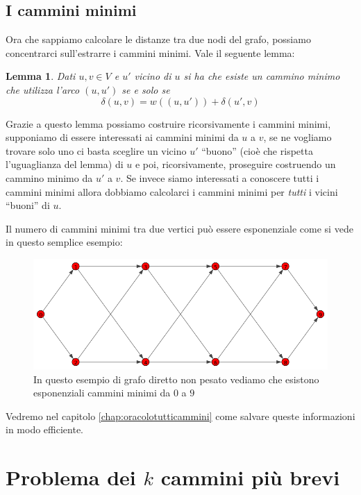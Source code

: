\documentclass[a4paper,10pt]{amsbook}
\newcounter{counter1}
\theoremstyle{plain}
\newtheorem{mylem}[counter1]{Lemma}
\theoremstyle{definition}
\theoremstyle{remark}
\newcommand{\pa}[1]{\left(#1\right)}
\begin{document}
\subsection{I cammini minimi}

Ora che sappiamo calcolare le distanze tra due nodi del grafo,
possiamo concentrarci sull'estrarre i cammini minimi. Vale il seguente
lemma:
\begin{mylem}
  \label{lem:vicinibuoni}
  Dati $u,v \in V$ e $u'$ vicino di $u$ si ha che esiste un cammino
  minimo che utilizza l'arco $(u,u')$ se e solo se
  \[ \delta \pa{ u,v} = w\pa{ (u,u') } + \delta \pa{ u',v} \]
\end{mylem}

Grazie a questo lemma possiamo costruire ricorsivamente i cammini
minimi, supponiamo di essere interessati ai cammini minimi da $u$ a
$v$, se ne vogliamo trovare solo uno ci basta sceglire un vicino $u'$
``buono'' (cioè che rispetta l'uguaglianza del lemma) di $u$ e poi,
ricorsivamente, proseguire costruendo un cammino minimo da $u'$ a
$v$. Se invece siamo interessati a conoscere tutti i cammini minimi
allora dobbiamo calcolarci i cammini minimi per \emph{tutti} i vicini
``buoni'' di $u$.

Il numero di cammini minimi tra due vertici può essere esponenziale
come si vede in questo semplice esempio:

\begin{figure}[H]
  \centering
  \includegraphics[width=\textwidth]{diamante}
  \caption{In questo esempio di grafo diretto non pesato vediamo che
    esistono esponenziali cammini minimi da $0$ a $9$}
  \label{fig:diamante}
\end{figure}

Vedremo nel capitolo \ref{chap:oracolotutticammini} come salvare
queste informazioni in modo efficiente.

\section{Problema dei $k$ cammini più brevi}
\end{document}
